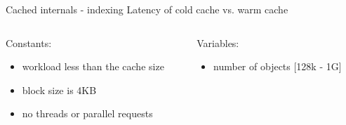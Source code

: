 \begin{frame}{Cached internals - indexing}
	Latency of cold cache vs. warm cache
	\begin{columns}[t]
		\begin{column}{.5\textwidth}
			Constants:
			\begin{itemize}
				\item workload less than the cache size
				\item block size is 4KB
				\item no threads or parallel requests 
			\end{itemize}
		\end{column}
		\begin{column}{.5\textwidth}
			Variables:
			\begin{itemize}
				\item number of objects [128k - 1G]
			\end{itemize}
		\end{column}
	\end{columns}

\end{frame}


